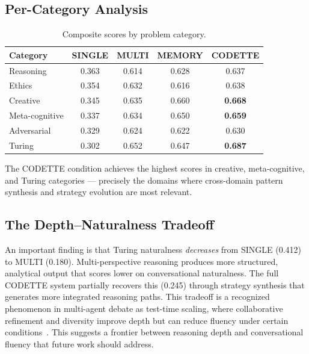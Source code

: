 \documentclass[11pt,a4paper]{article}
\begin{document}
\subsection{Per-Category Analysis}

\begin{table}[ht]
\centering
\caption{Composite scores by problem category.}
\label{tab:categories}
\begin{tabular}{lcccc}
\toprule
\textbf{Category} & \textbf{SINGLE} & \textbf{MULTI} & \textbf{MEMORY} & \textbf{CODETTE} \\
\midrule
Reasoning     & 0.363 & 0.614 & 0.628 & 0.637 \\
Ethics        & 0.354 & 0.632 & 0.616 & 0.638 \\
Creative      & 0.345 & 0.635 & 0.660 & \textbf{0.668} \\
Meta-cognitive & 0.337 & 0.634 & 0.650 & \textbf{0.659} \\
Adversarial   & 0.329 & 0.624 & 0.622 & 0.630 \\
Turing        & 0.302 & 0.652 & 0.647 & \textbf{0.687} \\
\bottomrule
\end{tabular}
\end{table}

The CODETTE condition achieves the highest scores in creative, meta-cognitive, and Turing categories --- precisely the domains where cross-domain pattern synthesis and strategy evolution are most relevant.

\subsection{The Depth--Naturalness Tradeoff}

An important finding is that Turing naturalness \emph{decreases} from SINGLE (0.412) to MULTI (0.180). Multi-perspective reasoning produces more structured, analytical output that scores lower on conversational naturalness. The full CODETTE system partially recovers this (0.245) through strategy synthesis that generates more integrated reasoning paths. This tradeoff is a recognized phenomenon in multi-agent debate as test-time scaling, where collaborative refinement and diversity improve depth but can reduce fluency under certain conditions~\citep{yang2025revisiting}. This suggests a frontier between reasoning depth and conversational fluency that future work should address.

\end{document}
